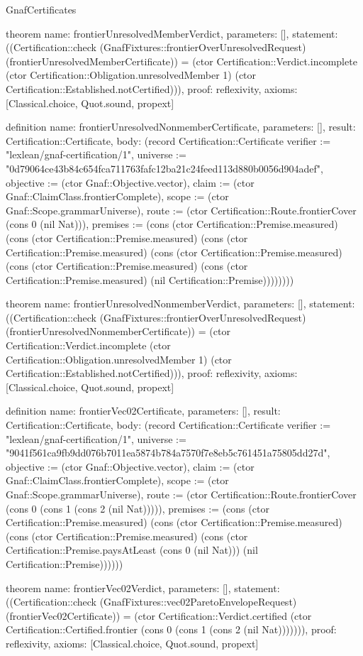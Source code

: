 \begin{lexlean}{GnafCertificates}
\begin{semanticmodule}
theorem{
  name: frontierUnresolvedMemberVerdict,
  parameters: [],
  statement: ((Certification::check (GnafFixtures::frontierOverUnresolvedRequest) (frontierUnresolvedMemberCertificate)) = (ctor Certification::Verdict.incomplete (ctor Certification::Obligation.unresolvedMember 1) (ctor Certification::Established.notCertified))),
  proof: reflexivity{},
  axioms: [Classical.choice, Quot.sound, propext]
}

definition{
  name: frontierUnresolvedNonmemberCertificate,
  parameters: [],
  result: Certification::Certificate,
  body: (record Certification::Certificate {verifier := "lexlean/gnaf-certification/1", universe := "0d79064ce43b84c654fca711763fafc12ba21c24feed113d880b0056d904adef", objective := (ctor Gnaf::Objective.vector), claim := (ctor Gnaf::ClaimClass.frontierComplete), scope := (ctor Gnaf::Scope.grammarUniverse), route := (ctor Certification::Route.frontierCover (cons 0 (nil Nat))), premises := (cons (ctor Certification::Premise.measured) (cons (ctor Certification::Premise.measured) (cons (ctor Certification::Premise.measured) (cons (ctor Certification::Premise.measured) (cons (ctor Certification::Premise.measured) (cons (ctor Certification::Premise.measured) (nil Certification::Premise)))))))})
}

theorem{
  name: frontierUnresolvedNonmemberVerdict,
  parameters: [],
  statement: ((Certification::check (GnafFixtures::frontierOverUnresolvedRequest) (frontierUnresolvedNonmemberCertificate)) = (ctor Certification::Verdict.incomplete (ctor Certification::Obligation.unresolvedMember 1) (ctor Certification::Established.notCertified))),
  proof: reflexivity{},
  axioms: [Classical.choice, Quot.sound, propext]
}

definition{
  name: frontierVec02Certificate,
  parameters: [],
  result: Certification::Certificate,
  body: (record Certification::Certificate {verifier := "lexlean/gnaf-certification/1", universe := "9041f561ca9fb9dd076b7011ea5874b784a7570f7e8eb5c761451a75805dd27d", objective := (ctor Gnaf::Objective.vector), claim := (ctor Gnaf::ClaimClass.frontierComplete), scope := (ctor Gnaf::Scope.grammarUniverse), route := (ctor Certification::Route.frontierCover (cons 0 (cons 1 (cons 2 (nil Nat))))), premises := (cons (ctor Certification::Premise.measured) (cons (ctor Certification::Premise.measured) (cons (ctor Certification::Premise.measured) (cons (ctor Certification::Premise.paysAtLeast (cons 0 (nil Nat))) (nil Certification::Premise)))))})
}

theorem{
  name: frontierVec02Verdict,
  parameters: [],
  statement: ((Certification::check (GnafFixtures::vec02ParetoEnvelopeRequest) (frontierVec02Certificate)) = (ctor Certification::Verdict.certified (ctor Certification::Certified.frontier (cons 0 (cons 1 (cons 2 (nil Nat))))))),
  proof: reflexivity{},
  axioms: [Classical.choice, Quot.sound, propext]
}


\end{semanticmodule}
\end{lexlean}
